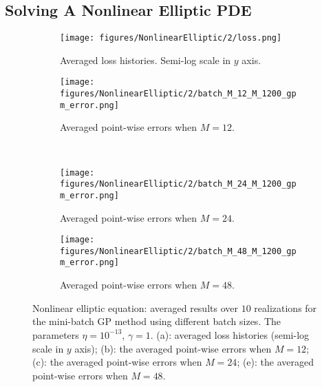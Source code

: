 \documentclass[10pt,reqno]{amsart}
\newcommand{\1}{{\chi}}
\numberwithin{equation}{section}
\theoremstyle{thmlemcorr}
\numberwithin{theorem}{section}
\theoremstyle{thmlemcorr*}
\theoremstyle{defi}
\theoremstyle{remexample}
\theoremstyle{ass}
\begin{document}
\subsection{Solving A Nonlinear Elliptic PDE}
\label{subsecNlElliptic}

\begin{figure}[!hbtbp]
	\centering          
	\begin{subfigure}[b]{0.3\textwidth}
		\texttt{[image: figures/NonlinearElliptic/2/loss.png]}
		\caption{Averaged loss histories. Semi-log scale in $y$ axis.}
		\label{fig:NonlinearElliptic:avgls}
	\end{subfigure} 
	\begin{subfigure}[b]{0.3\textwidth}
		\texttt{[image: figures/NonlinearElliptic/2/batch\_M\_12\_M\_1200\_gpm\_error.png]}
		\caption{Averaged point-wise errors when $M=12$.}
		\label{fig:NonlinearElliptic:avger12}
	\end{subfigure} \\
	\begin{subfigure}[b]{0.3\textwidth}
		\texttt{[image: figures/NonlinearElliptic/2/batch\_M\_24\_M\_1200\_gpm\_error.png]}
		\caption{Averaged point-wise errors when $M=24$.}
		\label{fig:NonlinearElliptic:avger24}
	\end{subfigure} 
	\begin{subfigure}[b]{0.3\textwidth}
		\texttt{[image: figures/NonlinearElliptic/2/batch\_M\_48\_M\_1200\_gpm\_error.png]}
		\caption{Averaged point-wise errors when $M=48$.}
		\label{fig:NonlinearElliptic:avger48}
	\end{subfigure} 
	\caption{Nonlinear elliptic equation: averaged results over $10$ realizations for the mini-batch GP method using different batch sizes. The parameters $\eta=10^{-13}$, $\gamma=1$. (a): averaged loss histories (semi-log scale in $y$ axis); (b): the averaged point-wise errors when $M=12$; (c): the averaged point-wise errors when $M=24$; (e): the averaged point-wise errors when $M=48$. }
	\label{fig:NonlinearElliptic:2}
\end{figure}
\end{document}
